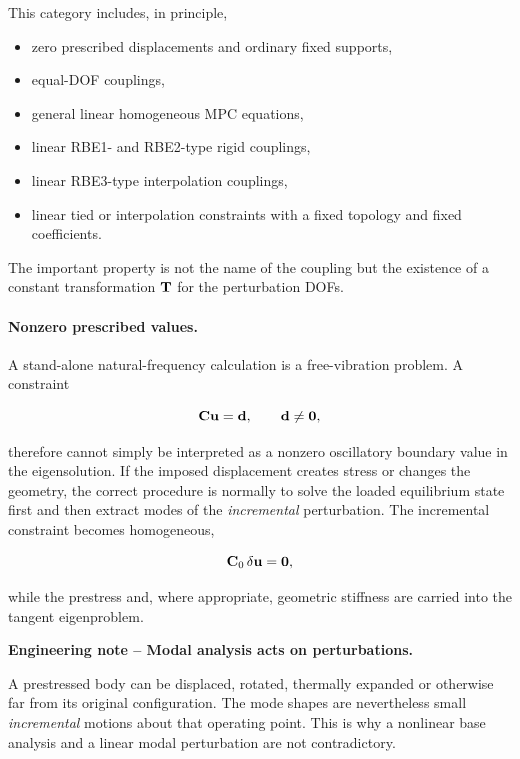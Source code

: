 This category includes, in principle,

\begin{itemize}
    \item zero prescribed displacements and ordinary fixed supports,
    \item equal-DOF couplings,
    \item general linear homogeneous MPC equations,
    \item linear RBE1- and RBE2-type rigid couplings,
    \item linear RBE3-type interpolation couplings,
    \item linear tied or interpolation constraints with a fixed topology and
          fixed coefficients.
\end{itemize}

The important property is not the name of the coupling but the existence of a
constant transformation $\mathbf{T}$ for the perturbation DOFs.

\paragraph{Nonzero prescribed values.}
A stand-alone natural-frequency calculation is a free-vibration problem. A
constraint

\begin{equation}
    \mathbf{C}\mathbf{u}=\mathbf{d},
    \qquad \mathbf{d}\neq\mathbf{0},
\end{equation}

therefore cannot simply be interpreted as a nonzero oscillatory boundary value
in the eigensolution. If the imposed displacement creates stress or changes the
geometry, the correct procedure is normally to solve the loaded equilibrium
state first and then extract modes of the \emph{incremental} perturbation. The
incremental constraint becomes homogeneous,

\begin{equation}
    \mathbf{C}_{0}\,\delta\mathbf{u}=\mathbf{0},
\end{equation}

while the prestress and, where appropriate, geometric stiffness are carried into
the tangent eigenproblem.

\begin{bbox}
\textbf{Engineering note -- Modal analysis acts on perturbations.}

A prestressed body can be displaced, rotated, thermally expanded or otherwise
far from its original configuration. The mode shapes are nevertheless small
\emph{incremental} motions about that operating point. This is why a nonlinear
base analysis and a linear modal perturbation are not contradictory.
\end{bbox}

